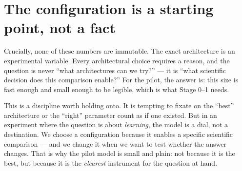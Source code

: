 \section{The configuration is a starting point, not a
fact}\label{the-configuration-is-a-starting-point-not-a-fact}

Crucially, none of these numbers are immutable. The exact architecture
is an experimental variable. Every architectural choice requires a
reason, and the question is never ``what architectures can we try?'' ---
it is ``what scientific decision does this comparison enable?'' For the
pilot, the answer is: this size is fast enough and small enough to be
legible, which is what Stage 0--1 needs.

This is a discipline worth holding onto. It is tempting to fixate on the
``best'' architecture or the ``right'' parameter count as if one
existed. But in an experiment where the question is about
\emph{learning}, the model is a dial, not a destination. We choose a
configuration because it enables a specific scientific comparison ---
and we change it when we want to test whether the answer changes. That
is why the pilot model is small and plain: not because it is the best,
but because it is the \emph{clearest} instrument for the question at
hand.
